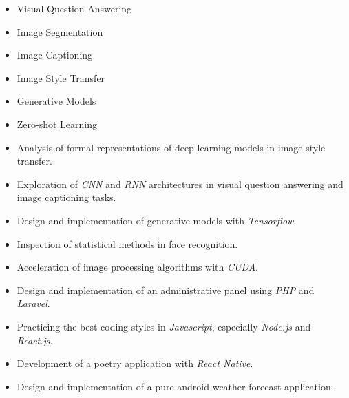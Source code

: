 \documentclass[10pt,a4paper]{altacv}
\begin{document}
\begin{multicols}{2}
\begin{itemize}
    \item Visual Question Answering
    \item Image Segmentation
    \item Image Captioning
    \item Image Style Transfer
    \item Generative Models
  	\item Zero-shot Learning
\end{itemize}
\end{multicols}


\begin{itemize}
\item Analysis of formal representations of deep learning models in image style transfer.
\item Exploration of \textit{CNN} and \textit{RNN} architectures in visual question answering and image captioning tasks.
\item Design and implementation of generative models with \textit{Tensorflow}.
\item Inspection of statistical methods in face recognition.
\item Acceleration of image processing algorithms with \textit{CUDA}.
\end{itemize}


\begin{itemize}
\item Design and implementation of an administrative panel using \textit{PHP} and \textit{Laravel}.
\item Practicing the best coding styles in \textit{Javascript}, especially \textit{Node.js} and \textit{React.js}.
\end{itemize}

\divider

\begin{itemize}
	\item Development of a poetry application with \textit{React Native}.
	\item Design and implementation of a pure android weather forecast application.
\end{itemize}
\end{document}

